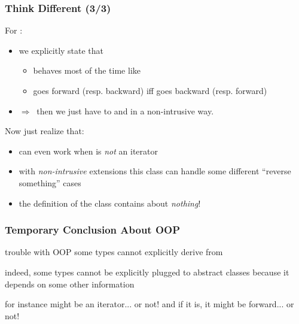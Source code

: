 \begin{frame}
  \frametitle{Think Different (3/3)}

For \bfreverseI:
\medskip
%
\begin{itemize}
\scriptsize
\item we {\color{mediumgreen}explicitly} state that \bfreverseI
  \begin{itemize} \scriptsize
  \item behaves most of the time like \bfI
  \item goes forward (resp. backward) iff \bfI goes backward (resp. forward)
  \end{itemize}
\item $\Rightarrow ~ $ then we just have to {\color{red}{implement}} \bfprev and \bfnext in a  {\color{mediumgreen}non-intrusive} way.
\end{itemize}

%
\bigskip
%

Now just realize that:
\medskip
%
\begin{itemize}
\scriptsize
\item \bfreverseI can even work when \bfI is \textit{not} an iterator
\item with \textit{non-intrusive} extensions this class can handle some different ``reverse something'' cases
\item the definition of the \bfreverseI class contains about  \textit{nothing}!
\end{itemize}

\end{frame}



\begin{frame}
  \frametitle{Temporary Conclusion About OOP}

\begin{block}{trouble with OOP}
  some types cannot explicitly derive from \bfForwardIterator
\end{block}

\bigskip
\bigskip

indeed, some types cannot be explicitly plugged to abstract classes
because it depends on some other information

\bigskip

{\scriptsize for instance \bfreverseI might be an iterator... or not!
  and if it is, it might be forward... or not! }


\end{frame}



